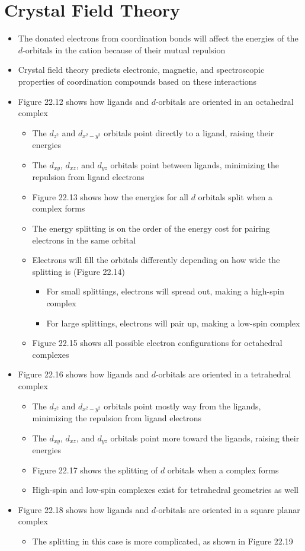 \documentclass[12pt, openany, letterpaper]{memoir}
\begin{document}
\section{Crystal Field Theory}
\begin{itemize}
	\item The donated electrons from coordination bonds will affect the energies of the $d$-orbitals in the cation because of their mutual repulsion
	\item Crystal field theory predicts electronic, magnetic, and spectroscopic properties of coordination compounds based on these interactions
	\item Figure 22.12 shows how ligands and $d$-orbitals are oriented in an octahedral complex
	\begin{itemize}
		\item The $d_{z^2}$ and $d_{x^2-y^2}$ orbitals point directly to a ligand, raising their energies
		\item The $d_{xy}$, $d_{xz}$, and $d_{yz}$ orbitals point between ligands, minimizing the repulsion from ligand electrons
		\item Figure 22.13 shows how the energies for all $d$ orbitals split when a complex forms
		\item The energy splitting is on the order of the energy cost for pairing electrons in the same orbital
		\item Electrons will fill the orbitals differently depending on how wide the splitting is (Figure 22.14)
		\begin{itemize}
			\item For small splittings, electrons will spread out, making a high-spin complex
			\item For large splittings, electrons will pair up, making a low-spin complex
		\end{itemize}
		\item Figure 22.15 shows all possible electron configurations for octahedral complexes
	\end{itemize}
	\item Figure 22.16 shows how ligands and $d$-orbitals are oriented in a tetrahedral complex
	\begin{itemize}
		\item The $d_{z^2}$ and $d_{x^2-y^2}$ orbitals point mostly way from the ligands, minimizing the repulsion from ligand electrons
		\item The $d_{xy}$, $d_{xz}$, and $d_{yz}$ orbitals point more toward the ligands, raising their energies
		\item Figure 22.17 shows the splitting of $d$ orbitals when a complex forms
		\item High-spin and low-spin complexes exist for tetrahedral geometries as well
	\end{itemize}
	\item Figure 22.18 shows how ligands and $d$-orbitals are oriented in a square planar complex
	\begin{itemize}
		\item The splitting in this case is more complicated, as shown in Figure 22.19
	\end{itemize}
\end{itemize}
\end{document}
